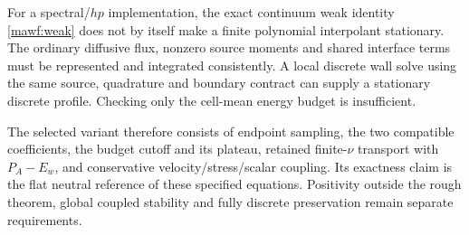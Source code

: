For a spectral/\(hp\) implementation, the exact continuum weak
identity \cref{mawf:weak} does not by itself make a finite polynomial
interpolant stationary. The ordinary diffusive flux, nonzero source
moments and shared interface terms must be represented and integrated
consistently. A local discrete wall solve using the same source,
quadrature and boundary contract can supply a stationary discrete
profile. Checking only the cell-mean energy budget is insufficient.

The selected variant therefore consists of endpoint sampling,
the two compatible coefficients, the budget cutoff and its plateau,
retained finite-\(\nu\) transport with \(P_A-E_w\), and conservative
velocity/stress/scalar coupling. Its exactness claim is the
flat neutral reference of these specified equations. Positivity
outside the rough theorem, global coupled stability and fully
discrete preservation remain separate requirements.
